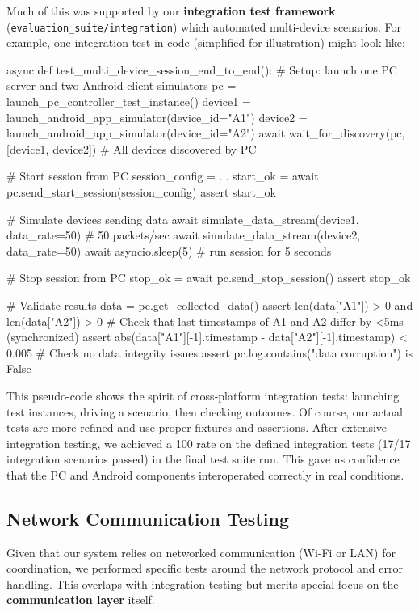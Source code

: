 Much of this was supported by our \textbf{integration test framework}
(\texttt{evaluation_suite/integration}) which automated multi-device scenarios.
For example, one integration test in code (simplified for illustration)
might look like:

    async def test_multi_device_session_end_to_end():
        # Setup: launch one PC server and two Android client simulators
        pc = launch_pc_controller_test_instance()
        device1 = launch_android_app_simulator(device_id="A1")
        device2 = launch_android_app_simulator(device_id="A2")
        await wait_for_discovery(pc, [device1, device2])
        # All devices discovered by PC

        # Start session from PC
        session_config = {...}
        start_ok = await pc.send_start_session(session_config)
        assert start_ok

        # Simulate devices sending data
        await simulate_data_stream(device1, data_rate=50)  # 50 packets/sec
        await simulate_data_stream(device2, data_rate=50)
        await asyncio.sleep(5)  # run session for 5 seconds

        # Stop session from PC
        stop_ok = await pc.send_stop_session()
        assert stop_ok

        # Validate results
        data = pc.get_collected_data()
        assert len(data["A1"]) > 0 and len(data["A2"]) > 0
        # Check that last timestamps of A1 and A2 differ by <5ms (synchronized)
        assert abs(data["A1"][-1].timestamp - data["A2"][-1].timestamp) < 0.005
        # Check no data integrity issues
        assert pc.log.contains("data corruption") is False

This pseudo-code shows the spirit of cross-platform integration tests:
launching test instances, driving a scenario, then checking outcomes. Of
course, our actual tests are more refined and use proper fixtures and
assertions. After extensive integration testing, we achieved a 100%
rate on the defined integration tests (17/17 integration scenarios
passed) in the final test suite run. This gave us confidence that the PC
and Android components interoperated correctly in real conditions.

\subsection{Network Communication Testing}

Given that our system relies on networked communication (Wi-Fi or LAN)
for coordination, we performed specific tests around the network
protocol and error handling. This overlaps with integration testing but
merits special focus on the \textbf{communication layer} itself.

